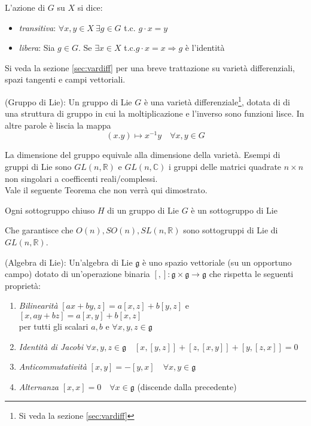 L'azione di $G$ su $X$ si dice:
\begin{itemize}
   \item \emph{transitiva}: \quad $\forall x,y \in X \: \exists g \in G$ t.c. $g\cdot x = y$
   \item \emph{libera}: \quad Sia $g \in G$. Se $\exists x \in X$ t.c.$ g\cdot x = x
      \Rightarrow g$ è l'identità
\end{itemize}
Si veda la sezione \ref{sec:vardiff} per una breve trattazione su varietà differenziali,
spazi tangenti e campi vettoriali.

\begin{definition}{(Gruppo di Lie):}
   Un gruppo di Lie $G$ è una varietà differenziale\footnote{Si veda la sezione
   \ref{sec:vardiff}}, dotata di di una struttura di gruppo in cui la
   moltiplicazione e l'inverso sono funzioni lisce. In altre parole è liscia la mappa
      $$ (x.y) \mapsto x^{-1}y \quad \forall x,y \in G$$
\end{definition}
La dimensione del gruppo equivale alla dimensione della varietà.
Esempi di gruppi di Lie sono $GL(n,\mathbb{R})$ e $GL(n,\mathbb{C})$ i gruppi
delle matrici quadrate $n \times n$ non singolari a coefficenti reali/complessi.\\
Vale il seguente Teorema che non verrà qui dimostrato.
\begin{theorem}
   Ogni sottogruppo chiuso $H$ di un gruppo di Lie $G$ è un sottogruppo di Lie
\end{theorem}
Che garantisce che $O(n), SO(n), SL(n,\mathbb{R})$ sono sottogruppi di Lie di
$GL(n,\mathbb{R})$.
\begin{definition}{(Algebra di Lie):}\label{def:LieAlgebra}
   Un'algebra di Lie $\mathfrak{g}$ è uno spazio vettoriale (su un opportuno campo)
   dotato di un'operazione binaria $[,] : \mathfrak{g} \times \mathfrak{g} \to \mathfrak{g}$
   che rispetta le seguenti proprietà:
   \begin{enumerate}
       \item \emph{Bilinearità} \quad $[ax+by,z] = a[x,z]+b[y,z]$ \quad e \quad
          $[x,ay+bz] = a[x,y] + b[x,z]$ \\
          per tutti gli scalari $a,b$ e $\forall x,y,z \in \mathfrak{g}$
       \item \emph{Identità di Jacobi} \quad $\forall x,y,z \in \mathfrak{g} \quad
          [x,[y,z]] + [z,[x,y]] + [y,[z,x]] = 0$
       \item \emph{Anticommutatività} \quad $[x,y] = -[y,x] \quad
          \forall x,y \in \mathfrak{g} $
       \item \emph{Alternanza} \quad $[x,x]=0 \quad \forall x \in \mathfrak{g}$ \quad
          (discende dalla precedente)
   \end{enumerate}
\end{definition}
